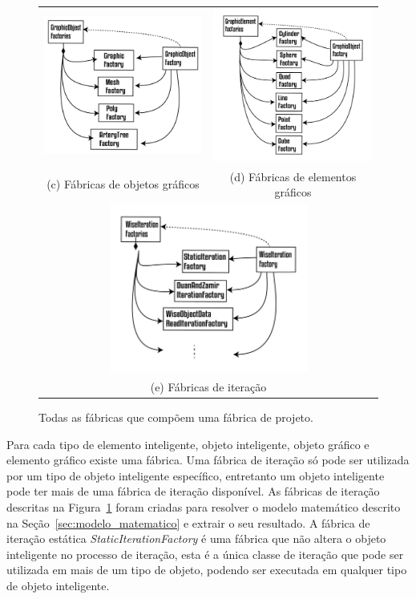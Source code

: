 \documentclass[a4paper,12pt]{monografia}
\theoremstyle{plain}
\theoremstyle{definition}
\theoremstyle{remark}
\begin{document}
\begin{figure}
\begin{tabular}{cc}
		\includegraphics[width=65mm]{Figures/GraphicObjectFactories.png} &   \includegraphics[width=65mm]{Figures/GraphicElementFactories.png} \\
		(c) Fábricas de objetos gráficos & (d) Fábricas de elementos gráficos \\[6pt]
		\multicolumn{2}{c}{\includegraphics[width=65mm]{Figures/WiseIterationFactories.png} }\\
		\multicolumn{2}{c}{(e) Fábricas de iteração}
	\end{tabular}
	\caption{Todas as fábricas que compõem uma fábrica de projeto.}
	\label{tab:factories} 
\end{figure}

Para cada tipo de elemento inteligente, objeto inteligente, objeto gráfico e elemento gráfico existe uma fábrica. Uma fábrica de iteração só pode ser utilizada por um tipo de objeto inteligente específico, entretanto um objeto inteligente pode ter mais de uma fábrica de iteração disponível. As fábricas de iteração descritas na Figura~\ref{tab:factories} foram criadas para resolver o modelo matemático descrito na Seção~\ref{sec:modelo_matematico} e extrair o seu resultado. A fábrica de iteração estática \textit{StaticIterationFactory} é uma fábrica que não altera o objeto inteligente no processo de iteração, esta é a única classe de iteração que pode ser utilizada em mais de um tipo de objeto, podendo ser executada em qualquer tipo de objeto inteligente.
\end{document}
